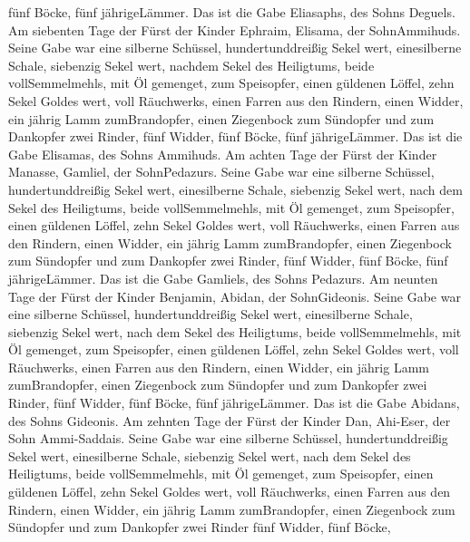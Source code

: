fünf Böcke, fünf jährigeLämmer. Das ist die Gabe Eliasaphs, des Sohns
Deguels.  Am siebenten Tage der Fürst der Kinder Ephraim,
Elisama, der SohnAmmihuds.  Seine Gabe war eine silberne
Schüssel, hundertunddreißig Sekel wert, einesilberne Schale, siebenzig
Sekel wert, nachdem Sekel des Heiligtums, beide vollSemmelmehls, mit Öl
gemenget, zum Speisopfer,  einen güldenen Löffel, zehn
Sekel Goldes wert, voll Räuchwerks,  einen Farren aus den
Rindern, einen Widder, ein jährig Lamm zumBrandopfer, 
einen Ziegenbock zum Sündopfer  und zum Dankopfer zwei
Rinder, fünf Widder, fünf Böcke, fünf jährigeLämmer. Das ist die Gabe
Elisamas, des Sohns Ammihuds.  Am achten Tage der Fürst der
Kinder Manasse, Gamliel, der SohnPedazurs.  Seine Gabe war
eine silberne Schüssel, hundertunddreißig Sekel wert, einesilberne
Schale, siebenzig Sekel wert, nach dem Sekel des Heiligtums, beide
vollSemmelmehls, mit Öl gemenget, zum Speisopfer,  einen
güldenen Löffel, zehn Sekel Goldes wert, voll Räuchwerks, 
einen Farren aus den Rindern, einen Widder, ein jährig Lamm
zumBrandopfer,  einen Ziegenbock zum Sündopfer
 und zum Dankopfer zwei Rinder, fünf Widder, fünf Böcke,
fünf jährigeLämmer. Das ist die Gabe Gamliels, des Sohns Pedazurs.
 Am neunten Tage der Fürst der Kinder Benjamin, Abidan, der
SohnGideonis.  Seine Gabe war eine silberne Schüssel,
hundertunddreißig Sekel wert, einesilberne Schale, siebenzig Sekel wert,
nach dem Sekel des Heiligtums, beide vollSemmelmehls, mit Öl gemenget,
zum Speisopfer,  einen güldenen Löffel, zehn Sekel Goldes
wert, voll Räuchwerks,  einen Farren aus den Rindern, einen
Widder, ein jährig Lamm zumBrandopfer,  einen Ziegenbock
zum Sündopfer  und zum Dankopfer zwei Rinder, fünf Widder,
fünf Böcke, fünf jährigeLämmer. Das ist die Gabe Abidans, des Sohns
Gideonis.  Am zehnten Tage der Fürst der Kinder Dan,
Ahi-Eser, der Sohn Ammi-Saddais.  Seine Gabe war eine
silberne Schüssel, hundertunddreißig Sekel wert, einesilberne Schale,
siebenzig Sekel wert, nach dem Sekel des Heiligtums, beide
vollSemmelmehls, mit Öl gemenget, zum Speisopfer,  einen
güldenen Löffel, zehn Sekel Goldes wert, voll Räuchwerks, 
einen Farren aus den Rindern, einen Widder, ein jährig Lamm
zumBrandopfer,  einen Ziegenbock zum Sündopfer
 und zum Dankopfer zwei Rinder fünf Widder, fünf Böcke,
